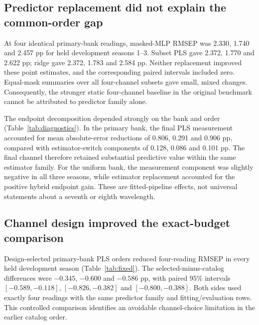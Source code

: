 \documentclass[11pt,a4paper]{article}
\begin{document}
\subsection{Predictor replacement did not explain the common-order gap}
At four identical primary-bank readings, masked-MLP RMSEP was 2.330, 1.740 and 2.457 pp for held development seasons 1--3. Subset PLS gave 2.372, 1.770 and 2.622 pp; ridge gave 2.372, 1.783 and 2.584 pp. Neither replacement improved these point estimates, and the corresponding paired intervals included zero. Equal-mask summaries over all four-channel subsets gave small, mixed changes. Consequently, the stronger static four-channel baseline in the original benchmark cannot be attributed to predictor family alone.

The endpoint decomposition depended strongly on the bank and order (Table~\ref{tab:diagnostics}). In the primary bank, the final PLS measurement accounted for mean absolute-error reductions of 0.806, 0.291 and 0.906 pp, compared with estimator-switch components of 0.128, 0.086 and 0.101 pp. The final channel therefore retained substantial predictive value within the same estimator family. For the uniform bank, the measurement component was slightly negative in all three seasons, while estimator replacement accounted for the positive hybrid endpoint gain. These are fitted-pipeline effects, not universal statements about a seventh or eighth wavelength.

\begin{table}[tbp]\centering\small
\caption{Signed mean absolute-error reductions at the hybrid endpoint. Total equals estimator replacement at seven readings plus the final reading within PLS. Values and population intervals are in pp; negative components are retained.}\label{tab:diagnostics}
\resizebox{\linewidth}{!}{}
\end{table}

\subsection{Channel design improved the exact-budget comparison}
Design-selected primary-bank PLS orders reduced four-reading RMSEP in every held development season (Table~\ref{tab:fixed}). The selected-minus-catalog differences were $-0.345$, $-0.600$ and $-0.586$ pp, with paired 95\% intervals $[-0.589,-0.118]$, $[-0.826,-0.382]$ and $[-0.800,-0.388]$. Both sides used exactly four readings with the same predictor family and fitting/evaluation rows. This controlled comparison identifies an avoidable channel-choice limitation in the earlier catalog order.
\end{document}

